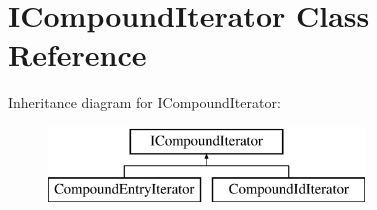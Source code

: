 \hypertarget{class_i_compound_iterator}{}\section{I\+Compound\+Iterator Class Reference}
\label{class_i_compound_iterator}
Inheritance diagram for I\+Compound\+Iterator\+:\begin{figure}[H]
\begin{center}
\leavevmode
\includegraphics[height=2.000000cm]{class_i_compound_iterator}
\end{center}
\end{figure}
